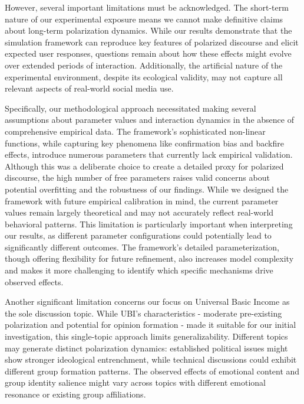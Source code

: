 However, several important limitations must be acknowledged. The short-term nature of our experimental exposure means we cannot make definitive claims about long-term polarization dynamics. While our results demonstrate that the simulation framework can reproduce key features of polarized discourse and elicit expected user responses, questions remain about how these effects might evolve over extended periods of interaction. Additionally, the artificial nature of the experimental environment, despite its ecological validity, may not capture all relevant aspects of real-world social media use. 

Specifically, our methodological approach necessitated making several assumptions about parameter values and interaction dynamics in the absence of comprehensive empirical data. The framework's sophisticated non-linear functions, while capturing key phenomena like confirmation bias and backfire effects, introduce numerous parameters that currently lack empirical validation. Although this was a deliberate choice to create a detailed proxy for polarized discourse, the high number of free parameters raises valid concerns about potential overfitting and the robustness of our findings. While we designed the framework with future empirical calibration in mind, the current parameter values remain largely theoretical and may not accurately reflect real-world behavioral patterns. This limitation is particularly important when interpreting our results, as different parameter configurations could potentially lead to significantly different outcomes. The framework's detailed parameterization, though offering flexibility for future refinement, also increases model complexity and makes it more challenging to identify which specific mechanisms drive observed effects.

Another significant limitation concerns our focus on Universal Basic Income as the sole discussion topic. While UBI's characteristics - moderate pre-existing polarization and potential for opinion formation - made it suitable for our initial investigation, this single-topic approach limits generalizability. Different topics may generate distinct polarization dynamics: established political issues might show stronger ideological entrenchment, while technical discussions could exhibit different group formation patterns. The observed effects of emotional content and group identity salience might vary across topics with different emotional resonance or existing group affiliations.

